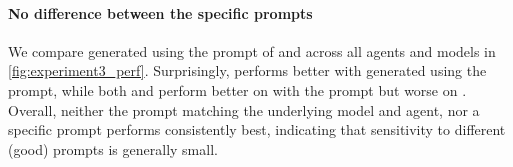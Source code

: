 

\paragraph{No difference between the specific prompts}
We compare \agentsmds{} generated using the prompt of \codex{} and \claudecode{} across all agents and models in \cref{fig:experiment3_perf}.
Surprisingly, \claudecode{} performs better with \agentsmds{} generated using the \codex{} prompt, while both \gptfive{} and \gptfivemini{} perform better on \swebench{} with the \codex{} prompt but worse on \planbench{}.
Overall, neither the prompt matching the underlying model and agent, nor a specific prompt performs consistently best, indicating that sensitivity to different (good) prompts is generally small.
